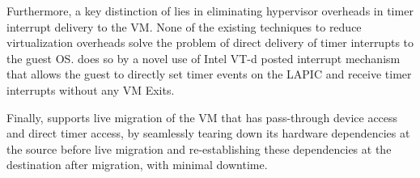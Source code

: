 Furthermore, a key distinction of \na lies in
eliminating hypervisor overheads in timer interrupt delivery 
to the VM. None of the existing techniques to reduce virtualization
overheads solve the problem of direct delivery of timer interrupts
to the guest OS. \na does so by a novel use of Intel VT-d posted 
interrupt mechanism that allows the guest to directly set timer events
on the LAPIC and receive timer interrupts without any VM Exits.

Finally, \na supports live migration of the VM that has pass-through device
access and direct timer access, by seamlessly tearing down its 
hardware dependencies  at the source before live migration and 
re-establishing these dependencies at the destination after migration,
with minimal downtime.


